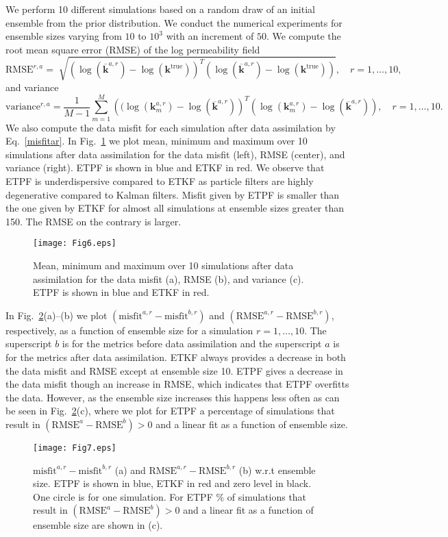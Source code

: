 \documentclass[12, a4paper]{article}
\numberwithin{equation}{section}
\begin{document}
We perform 10 different simulations based on a random draw of an initial ensemble from the prior distribution. We conduct the numerical experiments for ensemble sizes varying from $10$ to $10^3$ with an increment of $50$. 
We compute the root mean square error (RMSE) of the log permeability field 
\begin{equation*}
\text{RMSE}^{r,a} =\sqrt[]{\left(\log( \overline{\textbf{k}}^{a,r})-\log(\textbf{k}^\textrm{true})\right)^T \left( \log(\overline{\textbf{k}}^{a,r})-\log(\textbf{k}^\textrm{true})\right)} ,  \quad r=1,\hdots,10, \nonumber
\end{equation*}
and variance 
\begin{equation*}
\text{variance}^{r,a} = \frac{1}{M-1}\sum_{m=1}^M \left((\log(\textbf{k}^{a,r}_m) - \log(\overline{\textbf{k}}^{a,r})\right)^T \left(\log(\textbf{k}^{a,r}_m) -  \log(\overline{\textbf{k}}^{a,r})\right),  \quad r=1,\hdots,10. \nonumber
\end{equation*}
We also compute the data misfit for each simulation after data assimilation by Eq.~\eqref{misfitar}. 
In Fig.~\ref{Fig_HDerr} we plot mean, minimum and maximum over 10 simulations after data assimilation for the data misfit (left), RMSE (center), and variance (right). ETPF is shown in blue and ETKF in red. We observe that ETPF is underdispersive compared to ETKF as particle filters are highly degenerative compared to Kalman filters. Misfit given by ETPF is smaller than the one given by ETKF for almost all simulations at ensemble sizes greater than 150. The RMSE on the contrary is larger.
\begin{figure} [t]
	\centering		
	\texttt{[image: Fig6.eps]}	
	\caption{Mean, minimum and maximum over 10 simulations after data assimilation for the data misfit (a), RMSE (b), and variance (c). ETPF is shown in blue and ETKF in red.}	
	\label{Fig_HDerr}
\end{figure}  
In Fig.~\ref{Fig_HDchange}(a)--(b) we plot $(\text{misfit}^{a,r}- \text{misfit}^{b,r})$ and $(\text{RMSE}^{a,r}-\text{RMSE}^{b,r})$, respectively, as a function of ensemble size for a simulation $r=1,\hdots,10$. The superscript $b$ is for the metrics before data assimilation and the superscript $a$ is for the metrics after data assimilation. ETKF always provides a decrease in both the data misfit and RMSE except at ensemble size 10. ETPF gives a decrease in the data misfit though an increase in RMSE, which indicates that ETPF overfitts the data. However, as the ensemble size increases this happens less often as can be seen in Fig.~\ref{Fig_HDchange}(c), where we plot for ETPF a percentage of simulations that result in $(\text{RMSE}^{a}-\text{RMSE}^{b})>0$ and a linear fit as a function of ensemble size.
\begin{figure} [t]
	\centering		
	\texttt{[image: Fig7.eps]}	
	\caption{$\text{misfit}^{a,r}- \text{misfit}^{b,r}$ (a) and $\text{RMSE}^{a,r}-\text{RMSE}^{b,r}$ (b) w.r.t ensemble size. ETPF is shown in blue, ETKF in red and zero level in black. One circle is for one simulation. For ETPF $\%$ of simulations that result in $(\text{RMSE}^{a}-\text{RMSE}^{b})>0$ and a linear fit as a function of ensemble size are shown in (c).}	
	\label{Fig_HDchange}
\end{figure}  
\end{document}
